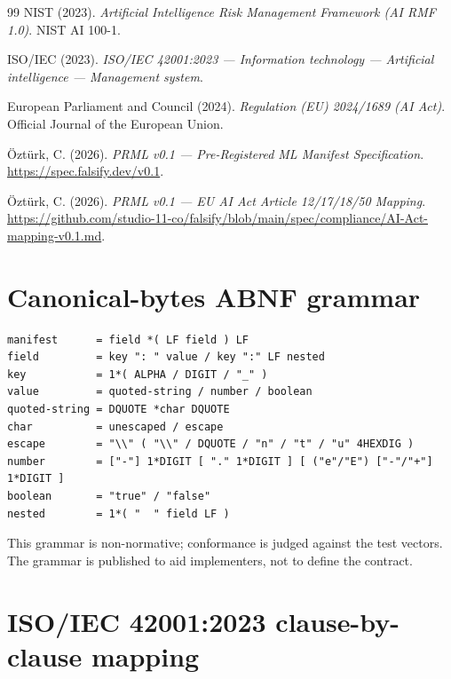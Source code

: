 \documentclass[11pt, a4paper]{article}
\begin{document}
\begin{thebibliography}{99}
NIST (2023). \emph{Artificial Intelligence Risk Management Framework (AI RMF 1.0)}. NIST AI 100-1.

ISO/IEC (2023). \emph{ISO/IEC 42001:2023 --- Information technology --- Artificial intelligence --- Management system}.

European Parliament and Council (2024). \emph{Regulation (EU) 2024/1689 (AI Act)}. Official Journal of the European Union.

Öztürk, C. (2026). \emph{PRML v0.1 --- Pre-Registered ML Manifest Specification}. \url{https://spec.falsify.dev/v0.1}.

Öztürk, C. (2026). \emph{PRML v0.1 --- EU AI Act Article 12/17/18/50 Mapping}. \url{https://github.com/studio-11-co/falsify/blob/main/spec/compliance/AI-Act-mapping-v0.1.md}.

\end{thebibliography}

\appendix

\section{Canonical-bytes ABNF grammar}
\label{app:abnf}

\begin{verbatim}
manifest      = field *( LF field ) LF
field         = key ": " value / key ":" LF nested
key           = 1*( ALPHA / DIGIT / "_" )
value         = quoted-string / number / boolean
quoted-string = DQUOTE *char DQUOTE
char          = unescaped / escape
escape        = "\\" ( "\\" / DQUOTE / "n" / "t" / "u" 4HEXDIG )
number        = ["-"] 1*DIGIT [ "." 1*DIGIT ] [ ("e"/"E") ["-"/"+"] 1*DIGIT ]
boolean       = "true" / "false"
nested        = 1*( "  " field LF )
\end{verbatim}

This grammar is non-normative; conformance is judged against the test vectors. The grammar is published to aid implementers, not to define the contract.

\section{ISO/IEC 42001:2023 clause-by-clause mapping}
\label{app:iso}
\end{document}
